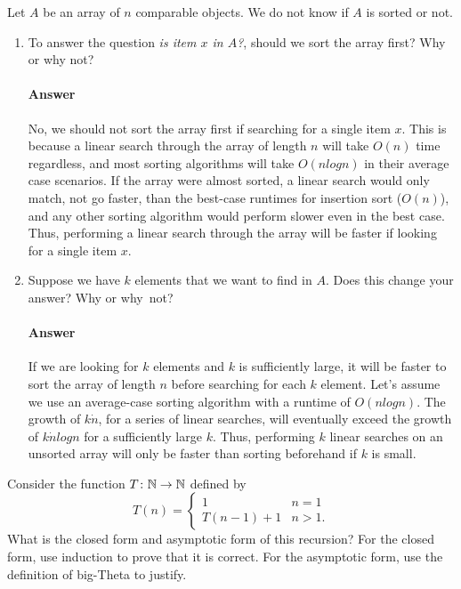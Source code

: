 \documentclass{article}
\begin{document}
\collab{\todo{}}
Let $A$ be an array of $n$ comparable objects.  We do not know if $A$ is sorted
or not.

\begin{enumerate}
    \item To answer the question \emph{is item $x$ in $A$?}, should we
        sort the array first?  Why or why not?

        \paragraph{Answer}{No, we should not sort the array first if searching for a single item $x$. This is because a linear search through the array of length $n$ will take $O(n)$ time regardless, and most sorting algorithms will take $O(nlogn)$ in their average case scenarios. If the array were almost sorted, a linear search would only match, not go faster, than the best-case runtimes for insertion sort ($O(n)$), and any other sorting algorithm would perform slower even in the best case. Thus, performing a linear search through the array will be faster if looking for a single item $x$.}

    \item Suppose we have $k$ elements that we want to find in $A$. Does this
        change your answer? Why or why~not?

        \paragraph{Answer}{If we are looking for $k$ elements and $k$ is sufficiently large, it will be faster to sort the array of length $n$ before searching for each $k$ element. Let's assume we use an average-case sorting algorithm with a runtime of $O(nlogn)$. The growth of $k \dot n$, for a series of linear searches, will eventually exceed the growth of $k \dot nlogn$ for a sufficiently large $k$. Thus, performing $k$ linear searches on an unsorted array will only be faster than sorting beforehand if $k$ is small.}

\end{enumerate}

\collab{\todo{}}
Consider the function $T \colon {\mathbb N} \to {\mathbb N}$ defined by
$$T(n) = \begin{cases}
            1        & n=1\\
            T(n-1)+1 & n>1.
         \end{cases}
$$
What is the closed form and asymptotic form of this recursion?  For the
closed form, use induction to prove that it is correct.  For the asymptotic
form, use the definition of big-Theta to justify.
\end{document}
